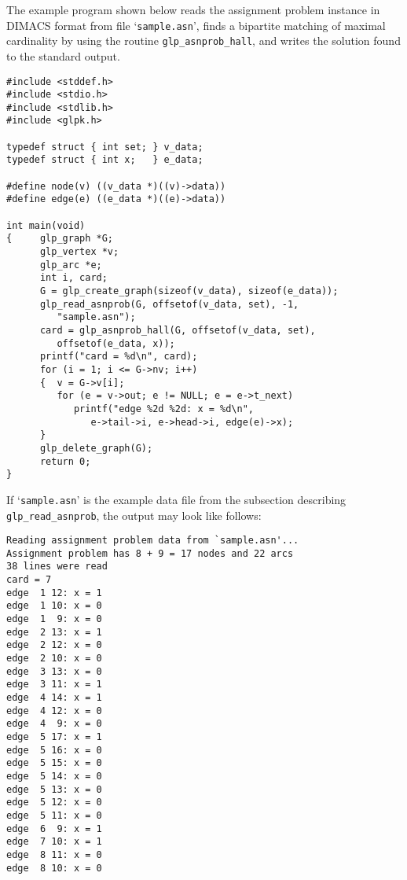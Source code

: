 \documentclass[11pt]{report}
\def\para#1{\noindent{\bf#1}}
\begin{document}
\para{Example}

The example program shown below reads the assignment problem instance
in DIMACS format from file `\verb|sample.asn|', finds a bipartite
matching of maximal cardinality by using the routine
\verb|glp_asnprob_hall|, and writes the solution found to the standard
output.

\begin{footnotesize}
\begin{verbatim}
#include <stddef.h>
#include <stdio.h>
#include <stdlib.h>
#include <glpk.h>

typedef struct { int set; } v_data;
typedef struct { int x;   } e_data;

#define node(v) ((v_data *)((v)->data))
#define edge(e) ((e_data *)((e)->data))

int main(void)
{     glp_graph *G;
      glp_vertex *v;
      glp_arc *e;
      int i, card;
      G = glp_create_graph(sizeof(v_data), sizeof(e_data));
      glp_read_asnprob(G, offsetof(v_data, set), -1,
         "sample.asn");
      card = glp_asnprob_hall(G, offsetof(v_data, set),
         offsetof(e_data, x));
      printf("card = %d\n", card);
      for (i = 1; i <= G->nv; i++)
      {  v = G->v[i];
         for (e = v->out; e != NULL; e = e->t_next)
            printf("edge %2d %2d: x = %d\n",
               e->tail->i, e->head->i, edge(e)->x);
      }
      glp_delete_graph(G);
      return 0;
}
\end{verbatim}
\end{footnotesize}

If `\verb|sample.asn|' is the example data file from the subsection
describing \verb|glp_read_asnprob|, the output may look like follows:

\newpage

\begin{footnotesize}
\begin{verbatim}
Reading assignment problem data from `sample.asn'...
Assignment problem has 8 + 9 = 17 nodes and 22 arcs
38 lines were read
card = 7
edge  1 12: x = 1
edge  1 10: x = 0
edge  1  9: x = 0
edge  2 13: x = 1
edge  2 12: x = 0
edge  2 10: x = 0
edge  3 13: x = 0
edge  3 11: x = 1
edge  4 14: x = 1
edge  4 12: x = 0
edge  4  9: x = 0
edge  5 17: x = 1
edge  5 16: x = 0
edge  5 15: x = 0
edge  5 14: x = 0
edge  5 13: x = 0
edge  5 12: x = 0
edge  5 11: x = 0
edge  6  9: x = 1
edge  7 10: x = 1
edge  8 11: x = 0
edge  8 10: x = 0
\end{verbatim}
\end{footnotesize}
\end{document}
